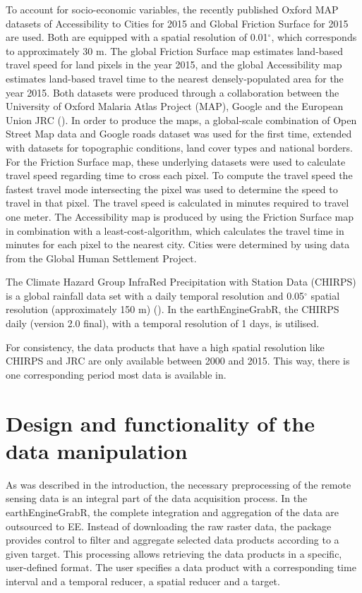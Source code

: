 To account for socio-economic variables, the recently published Oxford MAP datasets of Accessibility to Cities for 2015 and Global Friction Surface for 2015 are used. Both are equipped with a spatial resolution of 0.01$^\circ$, which corresponds to approximately 30 m. The global Friction Surface map estimates land-based travel speed for land pixels in the year 2015, and the global Accessibility map estimates land-based travel time to the nearest densely-populated area for the year 2015. Both datasets were produced through a collaboration between the University of Oxford Malaria Atlas Project (MAP), Google and the European Union JRC (\cite{weiss2018global}).
In order to produce the maps, a global-scale combination of Open Street Map data and Google roads dataset was used for the first time, extended with datasets for topographic conditions, land cover types and national borders.
For the Friction Surface map, these underlying datasets were used to calculate travel speed regarding time to cross each pixel. To compute the travel speed the fastest travel mode intersecting the pixel was used to determine the speed to travel in that pixel. The travel speed is calculated in minutes required to travel one meter. The Accessibility map is produced by using the Friction Surface map in combination with a least-cost-algorithm, which calculates the travel time in minutes for each pixel to the nearest city. Cities were determined by using data from the Global Human Settlement Project.  

The Climate Hazard Group InfraRed Precipitation with Station Data (CHIRPS) is a global rainfall data set with a daily temporal resolution and 0.05$^\circ$ spatial resolution (approximately 150 m) (\cite{funk2015climate}). In the earthEngineGrabR, the CHIRPS daily (version 2.0 final), with a temporal resolution of 1 days, is utilised.

For consistency, the data products that have a high spatial resolution like CHIRPS and JRC are only available between 2000 and 2015. This way, there is one corresponding period most data is available in.

\section{Design and functionality of the \\ data manipulation}

As was described in the introduction, the necessary preprocessing of the remote sensing data is an integral part of the data acquisition process. In the earthEngineGrabR, the complete integration and aggregation of the data are outsourced to EE.
Instead of downloading the raw raster data, the package provides control to filter and aggregate selected data products according to a given target. This processing allows retrieving the data products in a specific, user-defined format. The user specifies a data product with a corresponding time interval and a temporal reducer, a spatial reducer and a target. 

